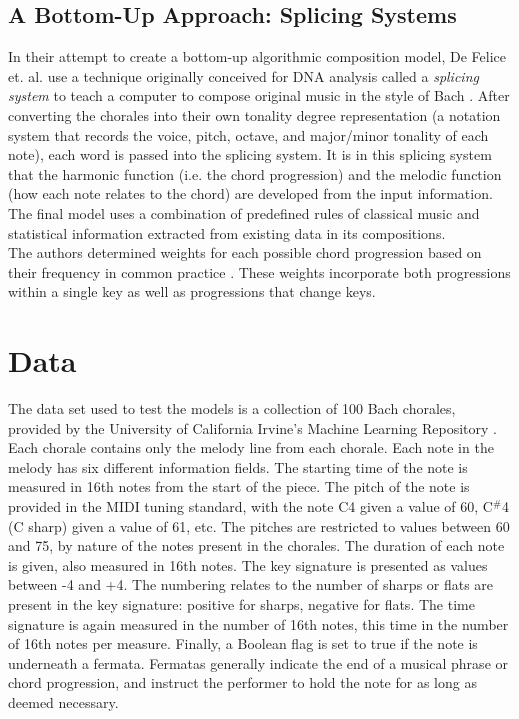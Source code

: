 \documentclass[12pt]{article}
\begin{document}
\subsection{A Bottom-Up Approach: Splicing Systems}
In their attempt to create a bottom-up algorithmic composition model, De Felice et. al. use a technique originally conceived for DNA analysis called a {\it splicing system} to teach a computer to compose original music in the style of Bach \cite{computer_composer}. After converting the chorales into their own tonality degree representation (a notation system that records the voice, pitch, octave, and major/minor tonality of each note), each word is passed into the splicing system. It is in this splicing system that the harmonic function (i.e. the chord progression) and the melodic function (how each note relates to the chord) are developed from the input information. The final model uses a combination of predefined rules of classical music and statistical information extracted from existing data in its compositions.\\

The authors determined weights for each possible chord progression based on their frequency in common practice \cite{computer_composer}. These weights incorporate both progressions within a single key as well as progressions that change keys. 

\section{Data}
The data set used to test the models is a collection of 100 Bach chorales, provided by the University of California Irvine's Machine Learning Repository \cite{data_set}. Each chorale contains only the melody line from each chorale. Each note in the melody has six different information fields. The starting time of the note is measured in 16th notes from the start of the piece. The pitch of the note is provided in the MIDI tuning standard, with the note C4 given a value of 60, C$^{\#}$4 (C sharp) given a value of 61, etc. The pitches are restricted to values between 60 and 75, by nature of the notes present in the chorales. The duration of each note is given, also measured in 16th notes. The key signature is presented as values between -4 and +4. The numbering relates to the number of sharps or flats are present in the key signature: positive for sharps, negative for flats. The time signature is again measured in the number of 16th notes, this time in the number of 16th notes per measure. Finally, a Boolean flag is set to true if the note is underneath a fermata. Fermatas generally indicate the end of a musical phrase or chord progression, and instruct the performer to hold the note for as long as deemed necessary.
\end{document}

